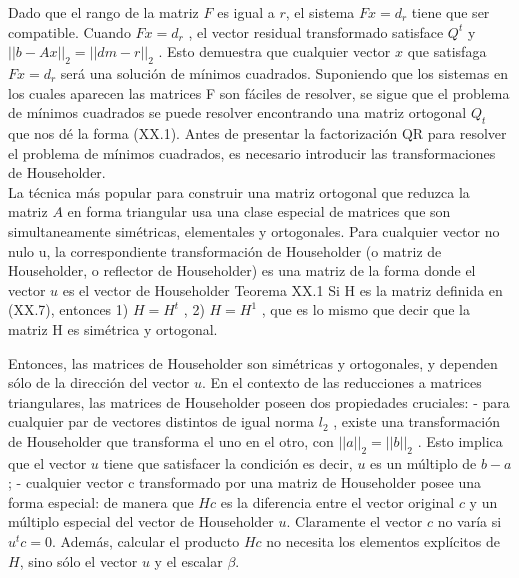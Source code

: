 \documentclass[twocolumn,twoside]{article}
\begin{document}
Dado que el rango de la matriz $F$ es igual a $r$, el sistema $F x = d_r$ tiene que ser compatible.
Cuando $F x = d_r$ , el vector residual transformado satisface $Q^t$ %
y $||b - A x||_2 = ||d m-r ||_2$   . Esto demuestra que cualquier vector $x$ que satisfaga $F x = d_r$
será una solución de m\'inimos cuadrados. Suponiendo que los sistemas en los cuales
aparecen las matrices F son fáciles de resolver, se sigue que el problema de m\'inimos
cuadrados se puede resolver encontrando una matriz ortogonal $Q_t$ que nos dé la forma
(XX.1).
Antes de presentar la factorización QR para resolver el problema de m\'inimos
cuadrados, es necesario introducir las transformaciones de Householder.\\
La técnica más popular para construir una matriz ortogonal que reduzca la matriz $A$
en forma triangular usa una clase especial de matrices que son simultaneamente
simétricas, elementales y ortogonales. Para cualquier vector no nulo u, la correspondiente 
transformación de Householder (o matriz de Householder, o reflector de
Householder) es una matriz de la forma
donde el vector $u$ es el vector de Householder
Teorema XX.1
Si H es la matriz definida en (XX.7), entonces
1) $H = H^t$ ,
2) $H = H^1$ ,
que es lo mismo que decir que la matriz H es simétrica y ortogonal.

Entonces, las matrices de Householder son simétricas y ortogonales, y dependen sólo
de la dirección del vector $u$.
En el contexto de las reducciones a matrices triangulares, las matrices de Householder
poseen dos propiedades cruciales:
- para cualquier par de vectores distintos de igual norma $l_2$ , existe una transformación de
Householder que transforma el uno en el otro,
con $||a||_2 = ||b||_2$ . Esto implica que el vector $u$ tiene que satisfacer la condición
es decir, $u$ es un múltiplo de $b-a$;
- cualquier vector c transformado por una matriz de Householder posee una forma especial:
de manera que $H c$ es la diferencia entre el vector original $c$ y un múltiplo especial del
vector de Householder $u$.
Claramente el vector $c$ no var\'ia si $u^t c = 0$. Además, calcular el producto $H c$ no necesita
los elementos expl\'icitos de $H$, sino sólo el vector $u$ y el escalar $\beta$.
\end{document}
